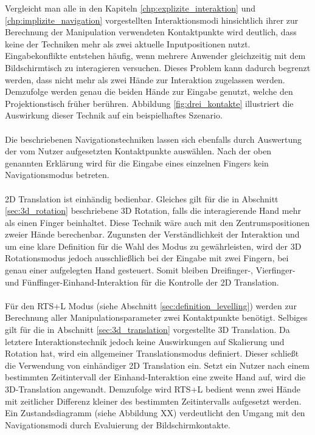 Vergleicht man alle in den Kapiteln \ref{chp:explizite_interaktion} und \ref{chp:implizite_navigation} vorgestellten Interaktionsmodi hinsichtlich ihrer zur Berechnung der Manipulation verwendeten Kontaktpunkte wird deutlich, dass keine der Techniken mehr als zwei aktuelle Inputpositionen nutzt. Eingabekonflikte entstehen häufig, wenn mehrere Anwender gleichzeitig mit dem Bildschirmtisch zu interagieren versuchen. Dieses Problem kann dadurch begrenzt werden, dass nicht mehr als zwei Hände zur Interaktion zugelassen werden. Demzufolge werden genau die beiden Hände zur Eingabe genutzt, welche den Projektionstisch früher berühren. Abbildung \ref{fig:drei_kontakte} illustriert die Auswirkung dieser Technik auf ein beispielhaftes Szenario.
\\\\
Die beschriebenen Navigationstechniken lassen sich ebenfalls durch Auswertung der vom Nutzer aufgesetzten Kontaktpunkte auswählen. Nach der oben genannten Erklärung wird für die Eingabe eines einzelnen Fingers kein Navigationsmodus betreten.
\\\\
2D Translation ist einhändig bedienbar. Gleiches gilt für die in Abschnitt \ref{sec:3d_rotation} beschriebene 3D Rotation, falls die interagierende Hand mehr als einen Finger beinhaltet. Diese Technik wäre auch mit den Zentrumspositionen zweier Hände berechenbar. Zugunsten der Verständlichkeit der Interaktion und um eine klare Definition für die Wahl des Modus zu gewährleisten, wird der 3D Rotationsmodus jedoch ausschließlich bei der Eingabe mit zwei Fingern, bei genau einer aufgelegten Hand gesteuert. Somit bleiben Dreifinger-, Vierfinger- und Fünffinger-Einhand-Interaktion für die Kontrolle der 2D Translation.
\\\\
Für den RTS+L Modus (siehe Abschnitt \ref{sec:definition_levelling}) werden zur Berechnung aller Manipulationsparameter zwei Kontaktpunkte benötigt. Selbiges gilt für die in Abschnitt \ref{sec:3d_translation} vorgestellte 3D Translation. Da letztere Interaktionstechnik jedoch keine Auswirkungen auf Skalierung und Rotation hat, wird ein allgemeiner Translationsmodus definiert. Dieser schließt die Verwendung von einhändiger 2D Translation ein. Setzt ein Nutzer nach einem bestimmten Zeitintervall der Einhand-Interaktion eine zweite Hand auf, wird die  3D-Translation angewandt. Demzufolge wird RTS+L bedient wenn zwei Hände mit zeitlicher Differenz kleiner des bestimmten Zeitintervalls aufgesetzt werden. Ein Zustandsdiagramm (siehe Abbildung XX) verdeutlicht den Umgang mit den Navigationsmodi durch Evaluierung der Bildschirmkontakte.


